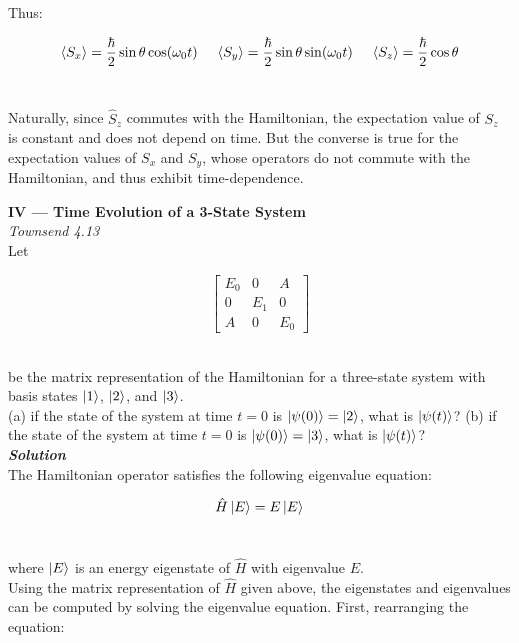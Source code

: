 \documentclass[9pt]{extarticle}
\newcommand{\bfit}[1]{\textbf{\textit{#1}}}
\begin{document}
\begin{multicols*}{2}
Thus:

$$\langle S_x \rangle = \frac \hbar 2 \sin\theta \cos(\omega_0 t) \hspace{0.5cm} \langle S_y \rangle = \frac \hbar 2 \sin\theta \sin(\omega_0t) \hspace{0.5cm} \langle S_z \rangle = \frac \hbar 2 \cos\theta$$ \ 

Naturally, since $\hat S_z$ commutes with the Hamiltonian, the expectation value of $S_z$ is constant and does not depend on time. But the converse is true for the expectation values of $S_x$ and $S_y$, whose operators do not commute with the Hamiltonian, and thus exhibit time-dependence. \\  








\hrulefill 

\hfill 

{\bf \LARGE IV --- Time Evolution of a 3-State System} \\ 

{\it Townsend 4.13} \\ 

Let

$$
\begin{bmatrix}
	E_0 & 0 & A \\ 
	0 & E_1 & 0 \\ 
	A & 0 & E_0
\end{bmatrix}
$$ \ 

be the matrix representation of the Hamiltonian for a three-state system with basis states $\ket{1}$, $\ket{2}$, and $\ket{3}$. \\ 

(a) if the state of the system at time $t=0$ is $\ket{\psi(0)} = \ket{2}$, what is $\ket{\psi(t)}$? (b) if the state of the system at time $t=0$ is $\ket{\psi(0)} = \ket{3}$, what is $\ket{\psi(t)}$? \\ 


{\bfit{Solution}} \\ 
The Hamiltonian operator satisfies the following eigenvalue equation: 

$$\hat H \ket E = E \ket E$$ \ 

where $\ket E$ is an energy eigenstate of $\hat H$ with eigenvalue $E$. \\ 

Using the matrix representation of $\hat H$ given above, the eigenstates and eigenvalues can be computed by solving the eigenvalue equation. First, rearranging the equation:


\end{multicols*}
\end{document}
